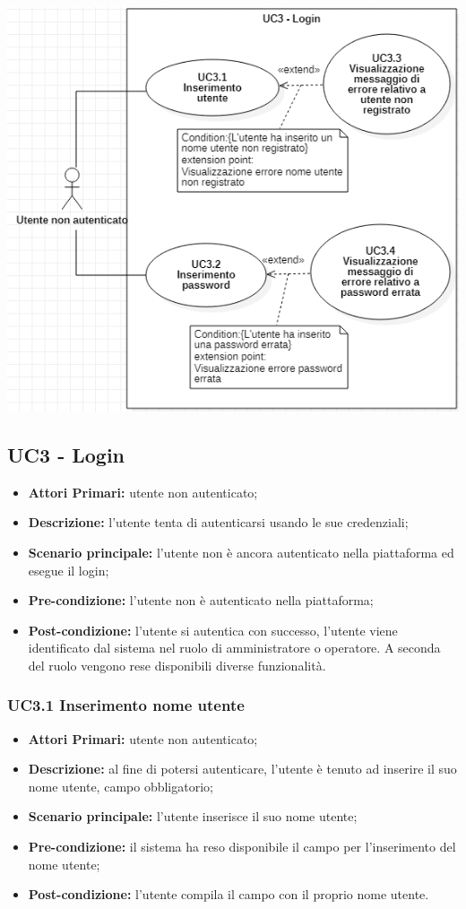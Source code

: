 
 \includegraphics{res/img/caso_duso_login.png}
\subsection{UC3 - Login}
\begin{itemize}
	\item \textbf{Attori Primari:} utente non autenticato;
	\item \textbf{Descrizione:} l'utente tenta di autenticarsi usando le sue credenziali;
	\item \textbf{Scenario principale:} l'utente non è ancora autenticato nella piattaforma ed esegue il login;
	\item \textbf{Pre-condizione:} l'utente non è autenticato nella piattaforma;
	\item \textbf{Post-condizione:} l'utente si autentica con successo, l'utente viene identificato dal sistema nel ruolo di amministratore o operatore. A seconda del ruolo vengono rese disponibili diverse funzionalità.
\end{itemize}

\subsubsection{UC3.1 Inserimento nome utente}
\begin{itemize}
	\item \textbf{Attori Primari:} utente non autenticato;
	\item \textbf{Descrizione:} al fine di potersi autenticare, l'utente è tenuto ad inserire il suo nome utente, campo obbligatorio;
	\item \textbf{Scenario principale:} l'utente inserisce il suo nome utente;
	\item \textbf{Pre-condizione:} il sistema ha reso disponibile il campo per l'inserimento del nome utente;
	\item \textbf{Post-condizione:} l'utente compila il campo con il proprio nome utente.
\end{itemize}	

